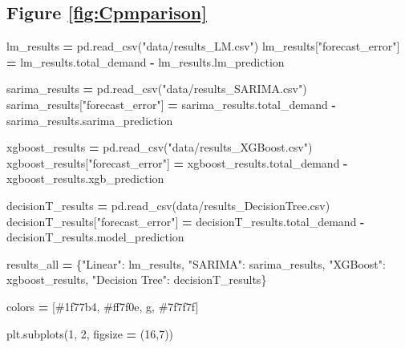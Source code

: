\documentclass[mstat,12pt]{unswthesis}
\newenvironment{Shaded}{\begin{snugshade}}{\end{snugshade}}
\newcommand{\DecValTok}[1]{\textcolor[rgb]{0.00,0.00,0.81}{#1}}
\newcommand{\NormalTok}[1]{#1}
\newcommand{\OperatorTok}[1]{\textcolor[rgb]{0.81,0.36,0.00}{\textbf{#1}}}
\newcommand{\StringTok}[1]{\textcolor[rgb]{0.31,0.60,0.02}{#1}}
\begin{document}
\subsection*{Figure \ref{fig:Cpmparison}}\label{figure-reffigcpmparison}

\begin{Shaded}
\begin{Highlighting}[]
\NormalTok{lm\_results }\OperatorTok{=}\NormalTok{ pd.read\_csv(}\StringTok{"data/results\_LM.csv"}\NormalTok{)}
\NormalTok{lm\_results[}\StringTok{"forecast\_error"}\NormalTok{] }\OperatorTok{=}\NormalTok{ lm\_results.total\_demand }\OperatorTok{{-}} 
\NormalTok{    lm\_results.lm\_prediction}

\NormalTok{sarima\_results }\OperatorTok{=}\NormalTok{ pd.read\_csv(}\StringTok{"data/results\_SARIMA.csv"}\NormalTok{)}
\NormalTok{sarima\_results[}\StringTok{"forecast\_error"}\NormalTok{] }\OperatorTok{=}\NormalTok{ sarima\_results.total\_demand }\OperatorTok{{-}} 
\NormalTok{    sarima\_results.sarima\_prediction}

\NormalTok{xgboost\_results }\OperatorTok{=}\NormalTok{ pd.read\_csv(}\StringTok{"data/results\_XGBoost.csv"}\NormalTok{)}
\NormalTok{xgboost\_results[}\StringTok{"forecast\_error"}\NormalTok{] }\OperatorTok{=}\NormalTok{ xgboost\_results.total\_demand }\OperatorTok{{-}} 
\NormalTok{    xgboost\_results.xgb\_prediction}

\NormalTok{decisionT\_results }\OperatorTok{=}\NormalTok{ pd.read\_csv(}\StringTok{\textquotesingle{}data/results\_DecisionTree.csv\textquotesingle{}}\NormalTok{)}
\NormalTok{decisionT\_results[}\StringTok{"forecast\_error"}\NormalTok{] }\OperatorTok{=} 
\NormalTok{    decisionT\_results.total\_demand }\OperatorTok{{-}}\NormalTok{ decisionT\_results.model\_prediction}

\NormalTok{results\_all }\OperatorTok{=}\NormalTok{ \{}\StringTok{"Linear"}\NormalTok{: lm\_results, }
               \StringTok{"SARIMA"}\NormalTok{: sarima\_results, }
               \StringTok{"XGBoost"}\NormalTok{: xgboost\_results,}
               \StringTok{"Decision Tree"}\NormalTok{: decisionT\_results\}}

\NormalTok{colors }\OperatorTok{=}\NormalTok{ [}\StringTok{\textquotesingle{}\#1f77b4\textquotesingle{}}\NormalTok{, }\StringTok{\textquotesingle{}\#ff7f0e\textquotesingle{}}\NormalTok{, }\StringTok{\textquotesingle{}g\textquotesingle{}}\NormalTok{, }\StringTok{\textquotesingle{}\#7f7f7f\textquotesingle{}}\NormalTok{]}

\NormalTok{plt.subplots(}\DecValTok{1}\NormalTok{, }\DecValTok{2}\NormalTok{, figsize }\OperatorTok{=}\NormalTok{ (}\DecValTok{16}\NormalTok{,}\DecValTok{7}\NormalTok{))}


\end{Highlighting}
\end{Shaded}
\end{document}
